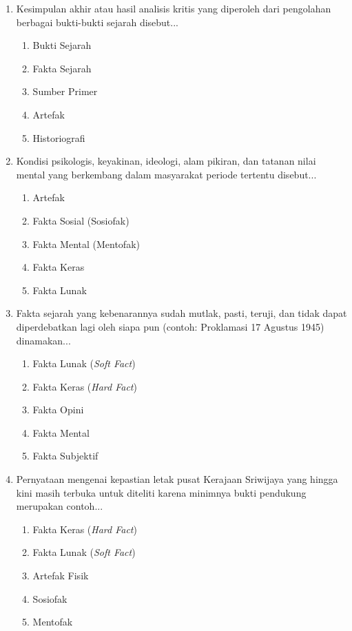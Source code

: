 \documentclass[12pt, a4paper]{article}
\begin{document}
\begin{enumerate}[label=\arabic*.]
    \item Kesimpulan akhir atau hasil analisis kritis yang diperoleh dari pengolahan berbagai bukti-bukti sejarah disebut...
    \begin{enumerate}[label=\Alph*.]
        \item Bukti Sejarah
        \item Fakta Sejarah
        \item Sumber Primer
        \item Artefak
        \item Historiografi
    \end{enumerate}

    \item Kondisi psikologis, keyakinan, ideologi, alam pikiran, dan tatanan nilai mental yang berkembang dalam masyarakat periode tertentu disebut...
    \begin{enumerate}[label=\Alph*.]
        \item Artefak
        \item Fakta Sosial (Sosiofak)
        \item Fakta Mental (Mentofak)
        \item Fakta Keras
        \item Fakta Lunak
    \end{enumerate}

    \item Fakta sejarah yang kebenarannya sudah mutlak, pasti, teruji, dan tidak dapat diperdebatkan lagi oleh siapa pun (contoh: Proklamasi 17 Agustus 1945) dinamakan...
    \begin{enumerate}[label=\Alph*.]
        \item Fakta Lunak (\textit{Soft Fact})
        \item Fakta Keras (\textit{Hard Fact})
        \item Fakta Opini
        \item Fakta Mental
        \item Fakta Subjektif
    \end{enumerate}

    \item Pernyataan mengenai kepastian letak pusat Kerajaan Sriwijaya yang hingga kini masih terbuka untuk diteliti karena minimnya bukti pendukung merupakan contoh...
    \begin{enumerate}[label=\Alph*.]
        \item Fakta Keras (\textit{Hard Fact})
        \item Fakta Lunak (\textit{Soft Fact})
        \item Artefak Fisik
        \item Sosiofak
        \item Mentofak
    \end{enumerate}


\end{enumerate}
\end{document}

